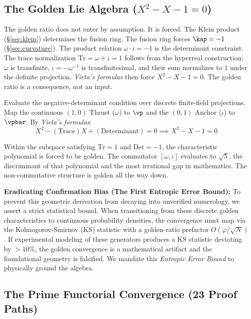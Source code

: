 \subsection{The Golden Lie Algebra ($X^2 - X - 1 = 0$)}\label{sec:golden_lie}

The golden ratio does not enter by assumption. It is forced. The Klein product (\S\ref{sec:klein}) determines the fusion ring. The fusion ring forces $\kap = -1$ (\S\ref{sec:curvature}). The product relation $\omega \cdot \iota = -1$ is the determinant constraint. The trace normalization $\mathrm{Tr} = \omega + \iota = 1$ follows from the hyperreal construction: $\omega$ is transfinite, $\iota = -\omega^{-1}$ is transfinitesimal, and their sum normalizes to $1$ under the definite projection. \emph{Vieta's formulas} then force $X^2 - X - 1 = 0$. The golden ratio is a consequence, not an input.

Evaluate the negative-determinant condition over discrete finite-field projections. Map the continuous $(1,0)$ Thrust ($\omega$) to $\vp$ and the $(0,1)$ Anchor ($\iota$) to $\vpbar$. By \emph{Vieta's formulas}:
$$X^2 - (\text{Trace})X + (\text{Determinant}) = 0 \implies X^2 - X - 1 = 0$$

Within the subspace satisfying $\mathrm{Tr} = 1$ and $\mathrm{Det} = -1$, the characteristic polynomial is forced to be golden. The commutator $[\omega, \iota]$ evaluates to $\sqrt{5}$, the discriminant of that polynomial and the most irrational gap in mathematics. The non-commutative structure is golden all the way down.

\textbf{Eradicating Confirmation Bias (The First Entropic Error Bound):} To prevent this geometric derivation from decaying into unverified numerology, we assert a strict statistical bound. When transitioning from these discrete golden characteristics to continuous probability densities, the convergence must map via the Kolmogorov-Smirnov (KS) statistic with a golden-ratio prefactor $O(\varphi / \sqrt{N})$. If experimental modeling of these generators produces a KS statistic deviating by $>10\%$, the golden convergence is a mathematical artifact and the foundational geometry is falsified. We mandate this \emph{Entropic Error Bound} to physically ground the algebra.

\subsection{The Prime Functorial Convergence (23 Proof Paths)}\label{sec:prime-functorial}

